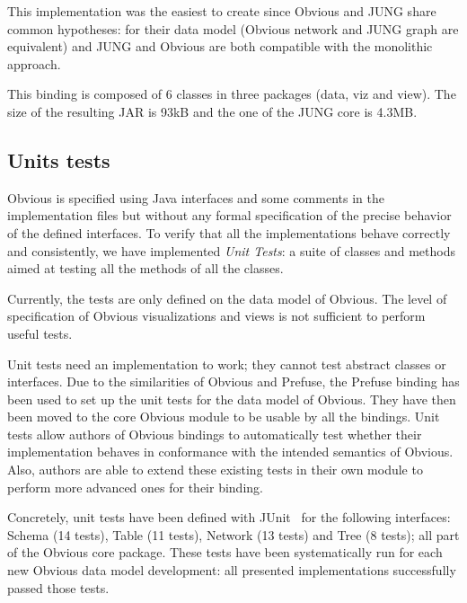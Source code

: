 This implementation was the easiest to create since Obvious and JUNG
share common hypotheses: for their data model (Obvious network and
JUNG graph are equivalent) and JUNG and Obvious are both compatible
with the monolithic approach.  

This binding is composed of 6 classes in three packages (data, viz
and view). The size of the resulting JAR is 93kB and the one of the
JUNG core is 4.3MB.

\subsection{Units tests}
\label{sub:unittests}

Obvious is specified using Java interfaces and some comments in the
implementation files but without any formal specification of the
precise behavior of the defined interfaces.  To verify that all the
implementations behave correctly and consistently, we have implemented
\emph{Unit Tests}: a suite of classes and methods aimed at testing all
the methods of all the classes.

Currently, the tests are only defined on the data model of Obvious.
The level of specification of Obvious visualizations and views is not
sufficient to perform useful tests.

Unit tests need an implementation to work; they cannot test abstract
classes or interfaces.  Due to the similarities of Obvious and
Prefuse, the Prefuse binding has been used to set up the unit tests
for the data model of Obvious.  They have then been moved to the core
Obvious module to be usable by all the bindings.  Unit tests allow
authors of Obvious bindings to automatically test whether their
implementation behaves in conformance with the intended semantics of
Obvious.  Also, authors are able to extend these existing tests in
their own module to perform more advanced ones for their binding.

Concretely, unit tests have been defined with JUnit~\cite{JUnit} for
the following interfaces: Schema (14 tests), Table (11 tests), Network
(13 tests) and Tree (8 tests); all part of the Obvious core package.
These tests have been systematically run for each new Obvious data
model development: all presented implementations successfully passed
those tests.



